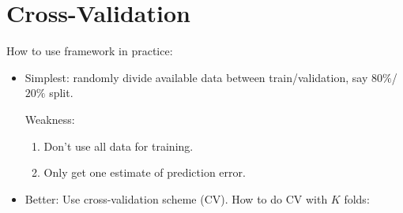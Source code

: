 \section{Cross-Validation}
How to use framework in practice:
\begin{itemize}
      \item Simplest: randomly divide available data
            between train/validation, say $ 80\% $/$ 20\% $ split.

            Weakness:
            \begin{enumerate}
                  \item Don't use all data for training.
                  \item Only get one estimate of prediction error.
            \end{enumerate}
      \item Better: Use cross-validation scheme (CV). How to
            do CV with $ K $ folds:
            \begin{figure}[!ht]
                  \centering
\end{figure}
\end{itemize}
